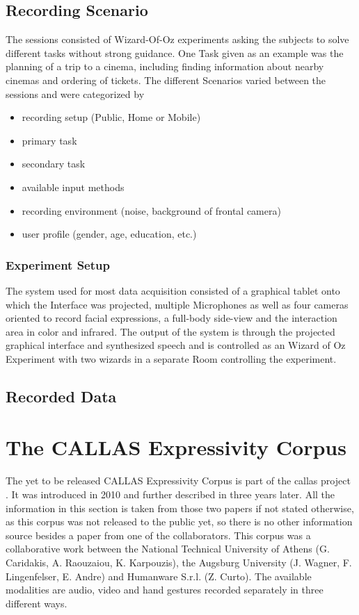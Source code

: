 \documentclass[a4paper]{article}
\begin{document}
		\subsection{Recording Scenario}
			The sessions consisted of  Wizard-Of-Oz experiments asking the subjects to solve different tasks without strong guidance. One Task given as an example was the planning of a trip to a cinema, including finding information about nearby cinemas and ordering of tickets. The different Scenarios varied between the sessions and were categorized by
			\begin{itemize}
				\item recording setup (Public, Home or Mobile)
				\item primary task
				\item secondary task
				\item available input methods
				\item recording environment (noise, background of frontal camera)
				\item user profile (gender, age, education, etc.)
			\end{itemize}
		\subsubsection{Experiment Setup}
				The system used for most data acquisition consisted of a graphical tablet onto which the Interface was projected, multiple Microphones as well as four cameras oriented to record facial expressions, a full-body side-view and the interaction area in color and infrared. The output of the system is through the projected graphical interface and synthesized speech and is controlled as an Wizard of Oz Experiment with two wizards in a separate Room controlling the experiment. 
				
		\subsection{Recorded Data}
		
	
	
	\section{The CALLAS Expressivity Corpus}
		The yet to be released CALLAS Expressivity Corpus is part of the \gls{callas} project \cite{2010MultimodalCorpusForGestureExpressivity}. It was introduced in 2010 \cite{2010MultimodalCorpusForGestureExpressivity} and further described in \cite{Caridakis2013} three years later. All the information in this section is taken from those two papers if not stated otherwise, as this corpus was not released to the public yet, so there is no other information source besides a paper from one of the collaborators\cite{wagner:2011:1}. This corpus was a collaborative work between the National Technical University of Athens (G. Caridakis, A. Raouzaiou, K. Karpouzis), the Augsburg University (J. Wagner, F. Lingenfelser, E. Andre) and Humanware S.r.l. (Z. Curto). The available modalities are audio, video and hand gestures recorded separately in three different ways. 
\end{document}
